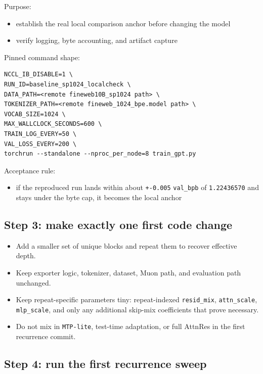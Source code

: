 \documentclass[11pt]{article}
\begin{document}
Purpose:

\begin{itemize}
    \item establish the real local comparison anchor before changing the model
    \item verify logging, byte accounting, and artifact capture
\end{itemize}

Pinned command shape:

\begin{verbatim}
NCCL_IB_DISABLE=1 \
RUN_ID=baseline_sp1024_localcheck \
DATA_PATH=<remote fineweb10B_sp1024 path> \
TOKENIZER_PATH=<remote fineweb_1024_bpe.model path> \
VOCAB_SIZE=1024 \
MAX_WALLCLOCK_SECONDS=600 \
TRAIN_LOG_EVERY=50 \
VAL_LOSS_EVERY=200 \
torchrun --standalone --nproc_per_node=8 train_gpt.py
\end{verbatim}

Acceptance rule:

\begin{itemize}
    \item if the reproduced run lands within about \texttt{+-0.005} \texttt{val\_bpb} of \texttt{1.22436570} and stays under the byte cap, it becomes the local anchor
\end{itemize}

\subsection*{Step 3: make exactly one first code change}

\begin{itemize}
    \item Add a smaller set of unique blocks and repeat them to recover effective depth.
    \item Keep exporter logic, tokenizer, dataset, Muon path, and evaluation path unchanged.
    \item Keep repeat-specific parameters tiny: repeat-indexed \texttt{resid\_mix}, \texttt{attn\_scale}, \texttt{mlp\_scale}, and only any additional skip-mix coefficients that prove necessary.
    \item Do not mix in \texttt{MTP-lite}, test-time adaptation, or full AttnRes in the first recurrence commit.
\end{itemize}

\subsection*{Step 4: run the first recurrence sweep}
\end{document}
